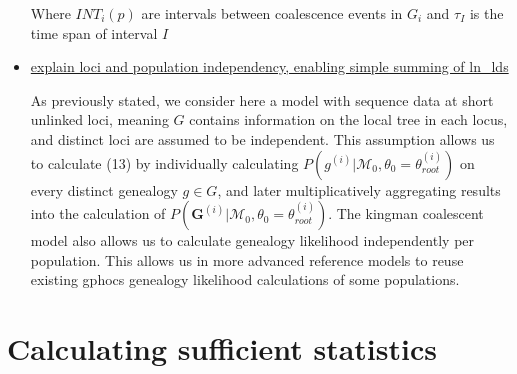\documentclass[11pt]{article}
\newcommand{\vect}[1]{\boldsymbol{\mathbf{#1}}}
\newcommand{\M}{\mathcal{M}}
\newcommand{\G}{\vect{G}}
\newcommand{\troot}{\theta_{root}}
\begin{document}
\begin{itemize}
Where $INT_i(p)$ are intervals between coalescence events in $G_i$ and $\tau_I$ is the time span of interval $I$





\item \underline{explain loci and population independency, enabling simple summing of ln\_lds}

As previously stated, we consider here a model with sequence data at short unlinked loci, meaning $G$ contains information on the local tree in each locus, and distinct loci are assumed to be independent. This assumption allows us to calculate (13) by individually calculating $P(g^{(i)} | \M_0, \theta_0=\troot^{(i)})$ on every distinct genealogy $g \in G$, and later multiplicatively aggregating results into the calculation of $P(\G^{(i)}|\M_0,\theta_0=\troot^{(i)})$. The kingman coalescent model also allows us to calculate genealogy likelihood independently per population. This allows us in more advanced reference models to reuse existing gphocs genealogy likelihood calculations of some populations. 


\end{itemize}


\section{Calculating sufficient statistics}
\end{document}
